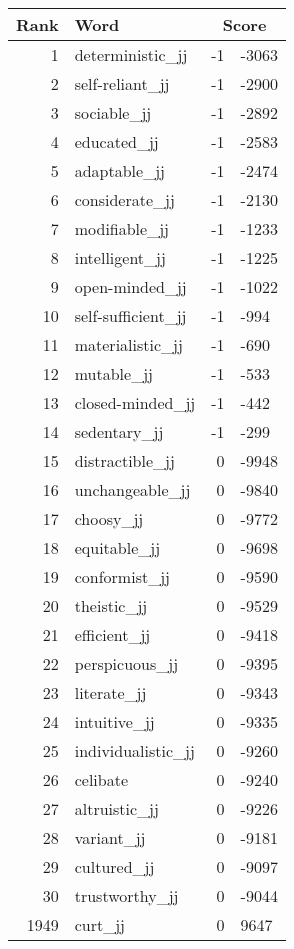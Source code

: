 \begin{longtable}[!htbp]{| rlr@{.}l |}
    \hline
    \textbf{Rank} & \textbf{Word} & \multicolumn{2}{c|}{\textbf{Score}} \\
    \hline
    \endhead
    1 & deterministic\_jj & -1 & -3063 \\
    2 & self-reliant\_jj & -1 & -2900 \\
    3 & sociable\_jj & -1 & -2892 \\
    4 & educated\_jj & -1 & -2583 \\
    5 & adaptable\_jj & -1 & -2474 \\
    6 & considerate\_jj & -1 & -2130 \\
    7 & modifiable\_jj & -1 & -1233 \\
    8 & intelligent\_jj & -1 & -1225 \\
    9 & open-minded\_jj & -1 & -1022 \\
    10 & self-sufficient\_jj & -1 & -994 \\
    11 & materialistic\_jj & -1 & -690 \\
    12 & mutable\_jj & -1 & -533 \\
    13 & closed-minded\_jj & -1 & -442 \\
    14 & sedentary\_jj & -1 & -299 \\
    15 & distractible\_jj & 0 & -9948 \\
    16 & unchangeable\_jj & 0 & -9840 \\
    17 & choosy\_jj & 0 & -9772 \\
    18 & equitable\_jj & 0 & -9698 \\
    19 & conformist\_jj & 0 & -9590 \\
    20 & theistic\_jj & 0 & -9529 \\
    21 & efficient\_jj & 0 & -9418 \\
    22 & perspicuous\_jj & 0 & -9395 \\
    23 & literate\_jj & 0 & -9343 \\
    24 & intuitive\_jj & 0 & -9335 \\
    25 & individualistic\_jj & 0 & -9260 \\
    26 & celibate & 0 & -9240 \\
    27 & altruistic\_jj & 0 & -9226 \\
    28 & variant\_jj & 0 & -9181 \\
    29 & cultured\_jj & 0 & -9097 \\
    30 & trustworthy\_jj & 0 & -9044 \\
    1949 & curt\_jj & 0 & 9647 \\

\end{longtable}
